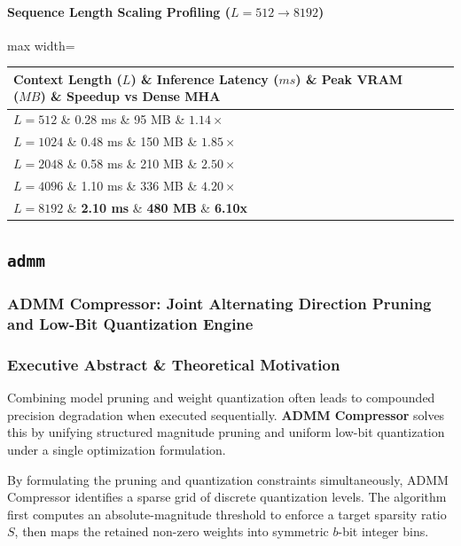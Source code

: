 \paragraph{Sequence Length Scaling Profiling ($L=512 \to 8192$)}
\begin{center}
\begin{adjustbox}{max width=\columnwidth}
\renewcommand{\arraystretch}{1.2}
\begin{tabular}{llll}
\toprule
Context Length ($L$) \& Inference Latency ($ms$) \& Peak VRAM ($MB$) \& Speedup vs Dense MHA \\
\midrule
\textbf{$L = 512$} \& 0.28 ms \& 95 MB \& $1.14\times$ \\
\textbf{$L = 1024$} \& 0.48 ms \& 150 MB \& $1.85\times$ \\
\textbf{$L = 2048$} \& 0.58 ms \& 210 MB \& $2.50\times$ \\
\textbf{$L = 4096$} \& 1.10 ms \& 336 MB \& $4.20\times$ \\
\textbf{$L = 8192$} \& \textbf{2.10 ms} \& \textbf{480 MB} \& \textbf{6.10x} \\


\bottomrule
\end{tabular}
\end{adjustbox}
\end{center}

\subsection{\texttt{admm}}
\subsubsection*{ADMM Compressor: Joint Alternating Direction Pruning and Low-Bit Quantization Engine}

\subsubsection*{Executive Abstract \& Theoretical Motivation}

Combining model pruning and weight quantization often leads to compounded precision degradation when executed sequentially. \textbf{ADMM Compressor} solves this by unifying structured magnitude pruning and uniform low-bit quantization under a single optimization formulation.

By formulating the pruning and quantization constraints simultaneously, ADMM Compressor identifies a sparse grid of discrete quantization levels. The algorithm first computes an absolute-magnitude threshold to enforce a target sparsity ratio $S$, then maps the retained non-zero weights into symmetric $b$-bit integer bins.

